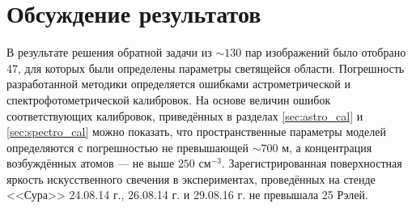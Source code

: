 \documentclass[12pt,a4paper]{article}
\begin{document}
\section{Обсуждение результатов} \label{sec:discuss}

В результате решения обратной задачи из $\sim 130$ пар изображений было отобрано 47, для которых были определены параметры светящейся области. Погрешность разработанной методики определяется ошибками астрометрической и спектрофотометрической калибровок. 
На основе величин ошибок соответствующих калибровок, приведённых в разделах \ref{sec:astro_cal} и \ref{sec:spectro_cal} можно показать, что пространственные параметры моделей определяются с погрешностью не превышающей $\sim700$ м, а концентрация возбуждённых атомов --- не выше $250$ см$^{-3}$. 
Зарегистрированная поверхностная яркость искусственного свечения в экспериментах, проведённых на стенде <<Сура>> 24.08.14 г., 26.08.14 г. и 29.08.16 г. не превышала 25 Рэлей.

\end{document}
